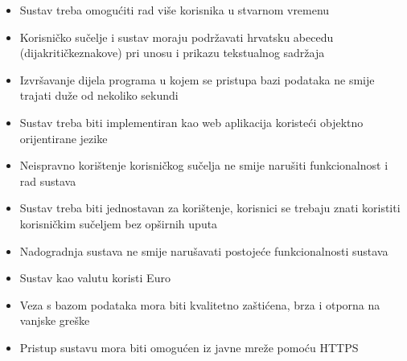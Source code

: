 			\begin{itemize}
				\item Sustav treba omogućiti rad više korisnika u stvarnom vremenu
				\item Korisničko sučelje i sustav moraju podržavati hrvatsku abecedu (dijakritičkeznakove) pri unosu i prikazu tekstualnog sadržaja
				\item Izvršavanje dijela programa u kojem se pristupa bazi podataka ne smije trajati duže od nekoliko sekundi
				\item Sustav treba biti implementiran kao web aplikacija koristeći objektno orijentirane jezike
				\item Neispravno korištenje korisničkog sučelja ne smije narušiti funkcionalnost i rad sustava
				\item Sustav treba biti jednostavan za korištenje, korisnici se trebaju znati koristiti korisničkim sučeljem bez opširnih uputa
				\item Nadogradnja sustava ne smije narušavati postojeće funkcionalnosti sustava
				\item Sustav kao valutu koristi Euro
				\item Veza s bazom podataka mora biti kvalitetno zaštićena, brza i otporna na vanjske greške
				\item Pristup sustavu mora biti omogućen iz javne mreže pomoću HTTPS
			\end{itemize} 
			 
	
